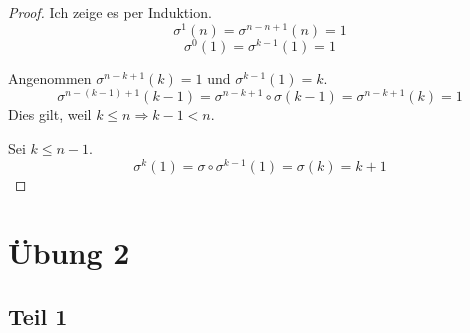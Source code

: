 \documentclass[10pt,a4paper]{article}
\begin{document}
\begin{proof}
Ich zeige es per Induktion.
\begin{equation}
\sigma^{1}(n) = \sigma^{n - n + 1}(n) = 1
\end{equation}
\begin{equation}
\sigma^{0}(1) = \sigma^{k - 1}(1) = 1
\end{equation}

Angenommen $\sigma^{n - k + 1}(k) = 1$ und $\sigma^{k - 1}(1) = k$.
\begin{equation}
\sigma^{n - (k - 1) + 1}(k - 1) = \sigma^{n - k + 1} \circ \sigma(k - 1) = \sigma^{n - k + 1}(k) = 1
\end{equation}
Dies gilt, weil $k \le n \Rightarrow k - 1 < n$.

Sei $k \le n - 1$.
\begin{equation}
\sigma^{k}(1) = \sigma \circ \sigma^{k - 1}(1) = \sigma(k) = k + 1
\end{equation}
\end{proof}

\section*{Übung 2}

\subsection*{Teil 1}
\end{document}
